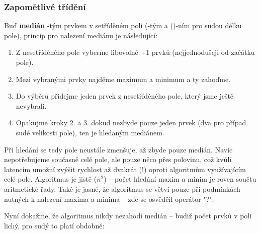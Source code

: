         \subsubsection{Zapomětlivé třídění}

        Buď \textbf{medián} \kk-tým prvkem v setříděném poli (\kk-tým a ()-ním pro sudou délku pole), princip pro nalezení mediánu je následující:
        \begin{enumerate}
          \item Z nesetříděného pole vyberme libovolně \kk$+1$ prvků (nejjednodušeji od začátku pole).
          \item Mezi vybranými prvky najděme maximum a minimum a ty zahoďme.
          \item Do výběru přidejme jeden prvek z nesetříděného pole, který jsme ještě nevybrali.
          \item Opakujme kroky 2. a 3. dokud nezbyde pouze jeden prvek (dva pro případ sudé velikosti pole), ten je hledaným mediánem.
        \end{enumerate}

        Při hledání se tedy pole neustále zmenšuje, až zbyde pouze medián. Navíc nepotřebujeme současně celé pole, ale pouze něco přes polovinu, což kvůli latencím umožní zvýšit rychlost až dvakrát (!) oproti algoritmům využívajícím celé pole. Algoritmus je jistě \OOO($n^2$) -- počet hledání maxim a minim je roven součtu aritmetické řady. Také je jasné, že algoritmus se větví pouze při podmínkách nutných k nalezení maxima a minima -- zde se osvědčil operátor \Vr"?".

        Nyní dokažme, že algoritmus nikdy nezahodí medián -- budiž počet prvků v poli lichý, pro sudý to platí obdobně:

